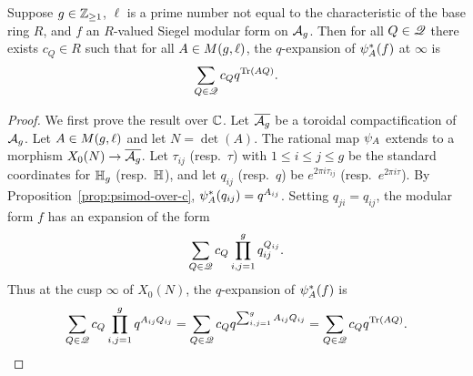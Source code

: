 \documentclass{amsart}
\begin{document}
\begin{proposition}\label{prop:q-expansion}
  Suppose  $g \in \mathbb{Z}_{\ge 1}$, $\ell$ is a prime number not equal to the characteristic of the base ring $R$,
  and $f$ an $R$-valued Siegel modular form on $\mathcal{A}_g$. 
  Then for all $Q\in \mathscr{Q}$ there exists $c_Q \in R$ such that for all %
  $A \in M(g,\ell)$, the $q$-expansion of 
  $\psi_{A}^*(f)$ at $\infty$ is
  \begin{equation}
    \sum_{Q \in \mathscr{Q}} c_Q q^{\operatorname{Tr}(AQ)}.\label{eq:q}
  \end{equation}
\end{proposition}

\begin{proof}
  We first prove the result over $\mathbb{C}$. Let $\overline{\mathcal{A}_g}$ be a toroidal compactification of $\mathcal{A}_g$. Let $A \in M(g,\ell)$ and let $N=\det(A)$. The rational map $\psi_{A}$ extends to a morphism $X_0(N) \to \overline{\mathcal{A}_g}$. Let $\tau_{ij}$ (resp.~$\tau$) with $1 \leq i \leq j \leq g$ be the standard coordinates for $\mathbb{H}_g$ (resp.~$\mathbb{H}$), and let $q_{ij}$ (resp.~$q$) be $e^{2\pi i \tau_{ij}}$ (resp.~$e^{2\pi i \tau}$). By Proposition~\ref{prop:psimod-over-c}, $\psi_{A}^*(q_{ij}) = q^{A_{ij}}$. Setting $q_{ji} = q_{ij}$, the modular form $f$ has an expansion of the form
    \[
      \sum_{Q \in \mathscr{Q}} c_Q \prod_{i,j=1}^g q_{ij}^{Q_{ij}}.
    \]
    Thus at the cusp $\infty$ of $X_0(N)$, the $q$-expansion of $\psi_{A}^*(f)$ is
    $$\sum_{Q \in \mathscr{Q}} c_Q \prod_{i,j=1}^g q^{A_{ij}Q_{ij}} = \sum_{Q \in \mathscr{Q}} c_Q q^{\sum_{i,j=1}^g A_{ij}Q_{ij}} 
    = \sum_{Q \in \mathscr{Q}} c_Q q^{\operatorname{Tr}(AQ)}.$$


\end{proof}
\end{document}

